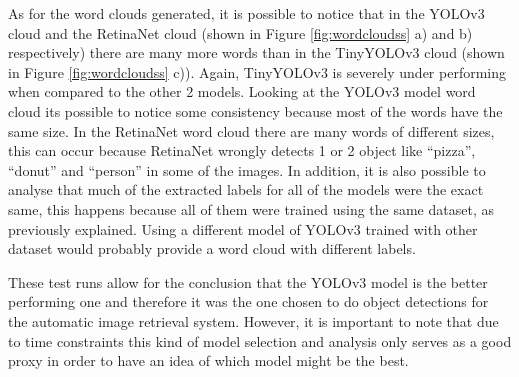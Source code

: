    As for the word clouds generated, it is possible to notice that in the YOLOv3 cloud and the RetinaNet cloud (shown in Figure \ref{fig:wordcloudss} a) and b) respectively) there are many more words than in the TinyYOLOv3 cloud (shown in Figure \ref{fig:wordcloudss} c)). Again, TinyYOLOv3 is severely under performing when compared to the other 2 models. Looking at the YOLOv3 model word cloud its possible to notice some consistency because most of the words have the same size. In the RetinaNet word cloud there are many words of different sizes, this can occur because RetinaNet wrongly detects 1 or 2 object like \enquote{pizza}, \enquote{donut} and \enquote{person} in some of the images.  In addition, it is also possible to analyse that much of the extracted labels for all of the models were the exact same, this happens because all of them were trained using the same dataset, as previously explained. Using a different model of YOLOv3 trained with other dataset would probably provide a word cloud with different labels.

    These test runs allow for the conclusion that the YOLOv3 model is the better performing one and therefore it was the one chosen to do object detections for the automatic image retrieval system. However, it is important to note that due to time constraints this kind of model selection and analysis only serves as a good proxy in order to have an idea of which model might be the best. 

